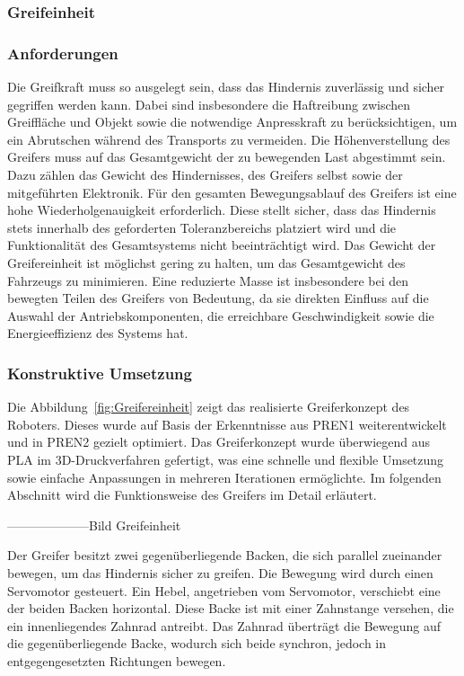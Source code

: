 \documentclass[main.tex]{subfiles} %
\begin{document}

\subsubsection{Greifeinheit}

\subsubsection*{Anforderungen}

Die Greifkraft muss so ausgelegt sein, dass das Hindernis zuverlässig und sicher gegriffen werden kann.
Dabei sind insbesondere die Haftreibung zwischen Greiffläche und Objekt sowie die notwendige Anpresskraft
zu berücksichtigen, um ein Abrutschen während des Transports zu vermeiden.
Die Höhenverstellung des Greifers muss auf das Gesamtgewicht der zu bewegenden Last abgestimmt sein.
Dazu zählen das Gewicht des Hindernisses, des Greifers selbst sowie der mitgeführten Elektronik.
Für den gesamten Bewegungsablauf des Greifers ist eine hohe Wiederholgenauigkeit erforderlich.
Diese stellt sicher, dass das Hindernis stets innerhalb des geforderten Toleranzbereichs platziert
wird und die Funktionalität des Gesamtsystems nicht beeinträchtigt wird.
Das Gewicht der Greifereinheit ist möglichst gering zu halten, um das Gesamtgewicht des Fahrzeugs zu minimieren.
Eine reduzierte Masse ist insbesondere bei den bewegten Teilen des Greifers von Bedeutung,
da sie direkten Einfluss auf die Auswahl der Antriebskomponenten, die erreichbare Geschwindigkeit
sowie die Energieeffizienz des Systems hat.

\subsubsection*{Konstruktive Umsetzung}

Die Abbildung~\ref{fig:Greifereinheit} zeigt das realisierte Greiferkonzept des Roboters.
Dieses wurde auf Basis der Erkenntnisse aus PREN1 weiterentwickelt und in PREN2 gezielt optimiert.
Das Greiferkonzept wurde überwiegend aus PLA im 3D-Druckverfahren gefertigt,
was eine schnelle und flexible Umsetzung sowie einfache Anpassungen in mehreren Iterationen ermöglichte.
Im folgenden Abschnitt wird die Funktionsweise des Greifers im Detail erläutert.

--------------------Bild Greifeinheit

\newpage

Der Greifer besitzt zwei gegenüberliegende Backen, die sich parallel zueinander bewegen,
um das Hindernis sicher zu greifen. Die Bewegung wird durch einen Servomotor gesteuert.
Ein Hebel, angetrieben vom Servomotor, verschiebt eine der beiden Backen horizontal.
Diese Backe ist mit einer Zahnstange versehen, die ein innenliegendes Zahnrad antreibt.
Das Zahnrad überträgt die Bewegung auf die gegenüberliegende Backe, wodurch sich beide
synchron, jedoch in entgegengesetzten Richtungen bewegen.
\end{document}
